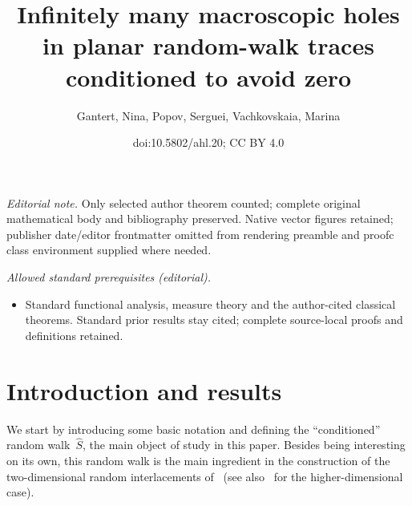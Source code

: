 \documentclass[10pt]{amsart}
\title{Infinitely many macroscopic holes in planar random-walk traces conditioned to avoid zero}
\author{Gantert, Nina, Popov, Serguei, Vachkovskaia, Marina}
\date{doi:10.5802/ahl.20; CC BY 4.0}
\theoremstyle{definition}\newtheorem{defi}[theo]{Definition}\newtheorem{rema}[theo]{Remark}\newtheorem{exam}[theo]{Example}\newtheorem{exem}[theo]{Example}\newtheorem{nota}[theo]{Notation}
\newcommand{\1}[1]{{\mathbf 1}{\{#1\}}}
\newcommand{\s}{{\widehat S}}
\newcommand{\8}{{\infty}}
\begin{document}
\maketitle
\noindent\textit{Editorial note.} Only selected author theorem counted; complete original mathematical body and bibliography preserved. Native vector figures retained; publisher date/editor frontmatter omitted from rendering preamble and proofc class environment supplied where needed.\par\medskip
\noindent\textit{Allowed standard prerequisites (editorial).}\begin{itemize}
\item Standard functional analysis, measure theory and the author-cited classical theorems. Standard prior results stay cited; complete source-local proofs and definitions retained.
\end{itemize}\medskip

\section{Introduction and results}\label{s_introres}

We start by introducing some basic notation and defining the ``conditioned'' random walk~$\s$, the main object of study in this paper. Besides being interesting on its own, this random walk is the main ingredient in the construction of the two-dimensional random interlacements of~\cite{CP16,CPV16} (see also~\cite{CT12,DRS14,SLT,Szn10} for the higher-dimensional case).
\end{document}
